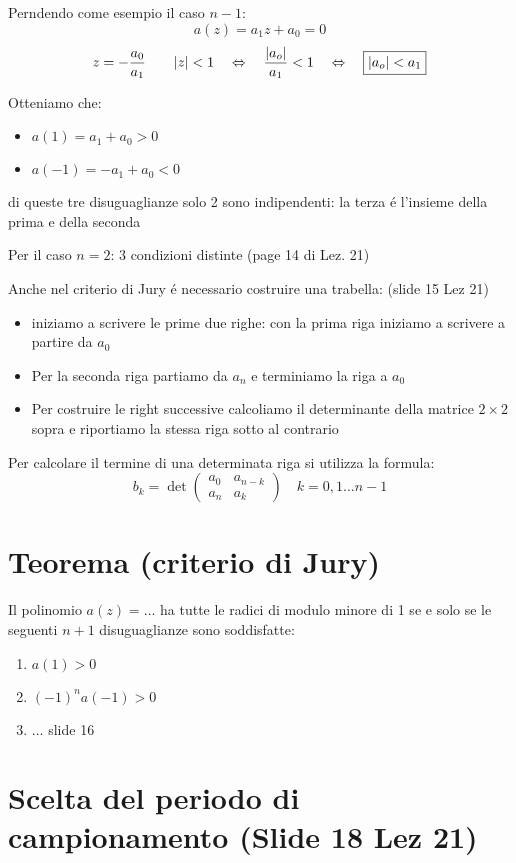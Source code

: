 \documentclass{article}
\begin{document}
Perndendo come esempio il caso $n - 1$:
\[ a(z) = a_1z + a_0 = 0 \]
\[ z = -\frac{a_0}{a_1} \qquad |z| < 1 \quad \Leftrightarrow \quad \frac{|a_o|}{a_1} < 1 \quad \Leftrightarrow\quad  \framebox{$|a_o| < a_1$} \]

Otteniamo che:
\begin{itemize}
    \item $ a(1) = a_1 + a_0 > 0$
    \item $ a(-1) = -a_1 + a_0 < 0$
\end{itemize}

di queste tre disuguaglianze solo 2 sono indipendenti: la terza \'e l'insieme della prima e della seconda

Per il caso $n = 2$: 3 condizioni distinte (page 14 di Lez. 21)


\bigbreak
Anche nel criterio di Jury \'e necessario costruire una trabella: (slide 15 Lez 21)
\begin{itemize}
    \item iniziamo a scrivere le prime due righe: con la prima riga iniziamo a scrivere a partire da $a_0$
    \item Per la seconda riga partiamo da $a_n$ e terminiamo la riga a $a_0$
    \item Per costruire le right successive calcoliamo il determinante della matrice $2\times 2$ sopra e riportiamo la stessa riga sotto al contrario
\end{itemize}

Per calcolare il termine di una determinata riga si utilizza la formula:
\[
    b_k = \det\begin{pmatrix}
        a_0 & a_{n-k}\\
        a_n & a_k
    \end{pmatrix} \quad k = 0,1\ldots n-1
\]

\section{Teorema (criterio di Jury)}
Il polinomio $a(z) = \ldots$ ha tutte le radici di modulo minore di 1 se e solo se le seguenti $n+1$ disuguaglianze sono soddisfatte:
\begin{enumerate}
    \item $a(1) > 0$
    \item $(-1)^n a(-1) > 0$
    \item $\ldots$ slide 16
\end{enumerate}

\section{Scelta del periodo di campionamento (Slide 18 Lez 21)}
\end{document}
